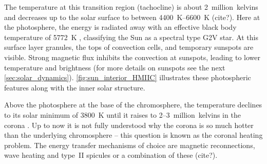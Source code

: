 The temperature at this transition region (tachocline) is about 2~million~kelvins and decreases up to the solar surface to between \SIrange{4400}{6600}{\K} (cite?). Here at the photosphere, the energy is radiated away with an effective black body temperature of \SI{5772}{\K} \citep{Mamajek2015}, classifying the Sun as a spectral type G2V star.
At this surface layer granules, the tops of convection cells, and temporary sunspots are visible. Strong magnetic flux inhibits the convection at sunspots, leading to lower temperature and brightness (for more details on sunspots see the next \autoref{sec:solar_dynamics}). \autoref{fig:sun_interior_HMIIC} illustrates these photospheric features along with the inner solar structure.\\
\begin{figure}[htb]
\end{figure}

Above the photosphere at the base of the chromosphere, the temperature declines to its solar minimum of \SI{3800}{\K} until it raises to \numrange{2}{3}~million~kelvins in the corona \citep{Billings1959,Liebenberg1975}. Up to now it is not fully understood why the corona is so much hotter than the underlying chromosphere -- this question is known as the coronal heating problem. The energy transfer mechanisms of choice are magnetic reconnections, wave heating and type~II spicules or a combination of these (cite?).

